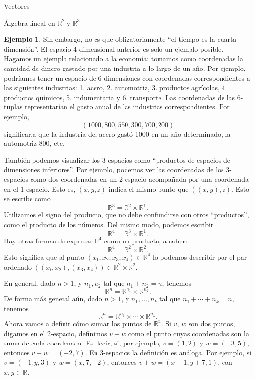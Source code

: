 \documentclass[a4paper,12pt,twoside,spanish,reqno]{amsbook}
\theoremstyle{definition}
\newtheorem{ejemplo}{Ejemplo}[section]
\theoremstyle{remark}
\newcommand{\R}{\mathbb R}
\begin{document}
\begin{chapter}{Vectores}
\begin{section}{Álgebra lineal en $\R^2$ y $\R^3$}
\begin{ejemplo}
			Sin embargo, no es que obligatoriamente ``el tiempo es la cuarta dimensión''. El espacio 4-dimensional anterior es solo un ejemplo posible. Hagamos un ejemplo relacionado a la economía: tomamos como coordenadas la cantidad de dinero gastado por una industria a lo largo de un año. 
			Por ejemplo, podríamos tener un espacio de 6 dimensiones con coordenadas correspondientes a las siguientes industrias: 1. acero, 2. automotriz, 3. productos agrícolas,  4. productos químicos, 5. indumentaria y 6. transporte. Las coordenadas de las 6-tuplas representarían el gasto anual de las industrias correspondientes. Por  ejemplo, 
			\begin{equation*}
			(1000, 800, 550, 300, 700, 200)
			\end{equation*}
			significaría que la industria del acero gastó 1000 en un año determinado, la automotriz 800, etc.
		\end{ejemplo} 

		También podemos visualizar los 3-espacios  como ``productos de espacios de dimensiones inferiores''. Por ejemplo, podemos ver las coordenadas de los 3-espacios como dos coordenadas en un 2-espacio acompañada por una coordenada en el 1-espacio. Esto es, $(x,y,z)$ indica el mismo punto que $((x,y),z)$.  Esto se escribe como 
		\begin{equation*}
			\R^3 = \R^2 \times \R^1.
		\end{equation*}
		Utilizamos el signo del producto, que no debe confundirse con otros ``productos'', como el producto de los números. Del mismo modo, podemos escribir
		\begin{equation*}
		\R^4 = \R^3 \times \R^1.
		\end{equation*}
		Hay otras formas de expresar $\R^4$ como un producto, a saber:
		\begin{equation*}
		\R^4 = \R^2 \times \R^2.
		\end{equation*}
		Esto significa que al punto $(x_1,x_2,x_3,x_4)\in \R^4$  lo podemos describir por el par ordenado $((x_l, x_2),(x_3, x_4))\in \R^2 \times \R^2$. 
		
		En  general, dado $n>1$, y $n_1,n_2$ tal que $n_1+n_2 = n$, tenemos
		\begin{equation*}
		\R^n= \R^{n_1} \times \R^{n_2}.
		\end{equation*} 
		De forma más general aún,  dado $n>1$, y $n_1,\ldots,n_k$ tal que $n_1+\cdots+n_k = n$, tenemos
		\begin{equation*}
		\R^n= \R^{n_1} \times \cdots\times \R^{n_k}.
		\end{equation*} 	
		Ahora vamos a definir cómo sumar los puntos de $\R^n$. Si $v$, $w$ son dos puntos, digamos en el 2-espacio,  definimos $v + w$ como el punto cuyas coordenadas son la suma de cada coordenada. Es decir, si, por ejemplo,  $v= (1, 2)$ y $w= (- 3, 5)$, entonces $v+w = (- 2, 7)$. En 3-espacios la definición es análoga. Por  ejemplo, si $v= (- 1, y, 3)$ y $w= (x, 7, - 2)$, entonces $v+w = (x - 1, y + 7, 1)$, con $x,y \in \R$.
		

\end{section}
\end{chapter}
\end{document}
